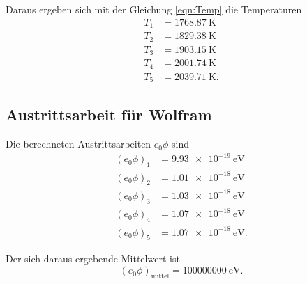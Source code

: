 \noindent Daraus ergeben sich mit der Gleichung \eqref{eqn:Temp} 
die Temperaturen
\begin{align*}
    T_\text{1} &= \SI{1768.87}{\kelvin} \\
    T_\text{2} &= \SI{1829.38}{\kelvin} \\
    T_\text{3} &= \SI{1903.15}{\kelvin} \\
    T_\text{4} &= \SI{2001.74}{\kelvin} \\
    T_\text{5} &= \SI{2039.71}{\kelvin}.
\end{align*}


\subsection{Austrittsarbeit für Wolfram}
Die berechneten Austrittsarbeiten $e_0 \phi$ sind
\begin{align*}
    (e_0 \phi)_\text{1} &= \SI{9.93e-19}{\electronvolt} \\
    (e_0 \phi)_\text{2} &= \SI{1.01e-18}{\electronvolt} \\
    (e_0 \phi)_\text{3} &= \SI{1.03e-18}{\electronvolt} \\
    (e_0 \phi)_\text{4} &= \SI{1.07e-18}{\electronvolt} \\
    (e_0 \phi)_\text{5} &= \SI{1.07e-18}{\electronvolt}.
\end{align*}

\noindent Der sich daraus ergebende Mittelwert ist
\begin{equation*}
    (e_0 \phi)_\text{mittel} = \SI{100000000}{\electronvolt}.
\end{equation*}